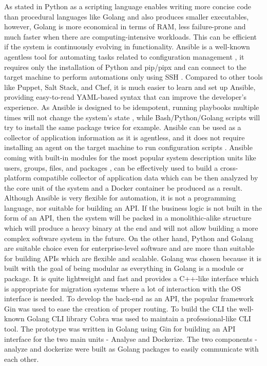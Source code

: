 \documentclass{article}
\begin{document}
\begin{multicols}{2}
As stated in \cite{NanzEtAl-2015} Python as a scripting language enables writing more concise code than procedural languages like Golang and also produces smaller executables, however, Golang is more economical in terms of RAM, less failure-prone and much faster when there are computing-intensive workloads. This can be efficient if the system is continuously evolving in functionality. Ansible is a well-known agentless tool for automating tasks related to configuration management \cite{Elradi-2023}, it requires only the installation of Python and pip/pipx \cite{Sesto-2022} and can connect to the target machine to perform automations only using SSH \cite{Elradi-2023}. Compared to other tools like Puppet, Salt Stack, and Chef, it is much easier to learn and set up Ansible, providing easy-to-read YAML-based syntax \cite{ChoiEtAl-2023} that can improve the developer’s experience. As Ansible is designed to be idempotent, running playbooks multiple times will not change the system's state \cite{ChoiEtAl-2023}, while Bash/Python/Golang scripts will try to install the same package twice for example. Ansible can be used as a collector of application information as it is agentless, and it does not require installing an agent on the target machine to run configuration scripts \cite{ChoiEtAl-2023}. Ansible coming with built-in modules for the most popular system description units like users, groups, files, and packages \cite{Kumar-2023}, can be effectively used to build a cross-platform compatible collector of application data which can be then analyzed by the core unit of the system and a Docker container be produced as a result. Although Ansible is very flexible for automation, it is not a programming language, nor suitable for building an API. If the business logic is not built in the form of an API, then the system will be packed in a monolithic-alike structure which will produce a heavy binary at the end and will not allow building a more complex software system in the future. On the other hand, Python and Golang are suitable choice even for enterprise-level software and are more than suitable for building APIs which are flexible and scalable. Golang was chosen because it is built with the goal of being modular as everything in Golang is a module or package. It is quite lightweight and fast and provides a C++-like interface which is appropriate for migration systems where a lot of interaction with the OS interface is needed. To develop the back-end as an API, the popular framework Gin was used to ease the creation of proper routing. To build the CLI the well-known Golang CLI library Cobra was used to maintain a professional-like CLI tool. The prototype was written in Golang using Gin for building an API interface for the two main units - Analyse and Dockerize. The two components - analyze and dockerize were built as Golang packages to easily communicate with each other. 


\end{multicols}
\end{document}
